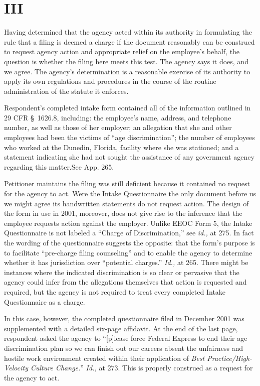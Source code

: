 \section{III}

  Having determined that the agency acted within its authority in
formulating the rule that a filing is deemed a charge if the document
reasonably can be construed to request agency action and appropriate
relief on the employee's behalf, the question is whether the filing
here meets this test. The agency says it does, and we agree. The
agency's determination is a reasonable exercise of its authority to
apply its own regulations and procedures in the course of the routine
administration of the statute it enforces.

  Respondent's completed intake form contained all of the information
outlined in 29 CFR \S~1626.8, including: the employee's name,
address, and telephone number, as well as those of her employer; an
allegation that she and other employees had been the victims of ``age
discrimination''; the number of employees who worked at the Dunedin,
Florida, facility where she was stationed; and a statement indicating
she had not sought the assistance of any government agency regarding
this matter.See App. 265.\newpage 

  Petitioner maintains the filing was still deficient because
it contained no request for the agency to act. Were the Intake
Questionnaire the only document before us we might agree its handwritten
statements do not request action. The design of the form in use in
2001, moreover, does not give rise to the inference that the employee
requests action against the employer. Unlike EEOC Form 5, the Intake
Questionnaire is not labeled a ``Charge of Discrimination,'' see
\emph{id.,} at 275. In fact the wording of the questionnaire suggests
the opposite: that the form's purpose is to facilitate ``pre-charge
filing counseling'' and to enable the agency to determine whether it
has jurisdiction over ``potential charges.'' \emph{Id.,} at 265.
There might be instances where the indicated discrimination is so clear
or pervasive that the agency could infer from the allegations themselves
that action is requested and required, but the agency is not required to
treat every completed Intake Questionnaire as a charge.

  In this case, however, the completed questionnaire filed in December
2001 was supplemented with a detailed six-page affidavit. At the end of
the last page, respondent asked the agency to ``[p]lease force Federal
Express to end their age discrimination plan so we can finish out our
careers absent the unfairness and hostile work environment created
within their application of \emph{Best Practice/High-Velocity Culture
Change.}'' \emph{Id.,} at 273. This is properly construed as a
request for the agency to act.

